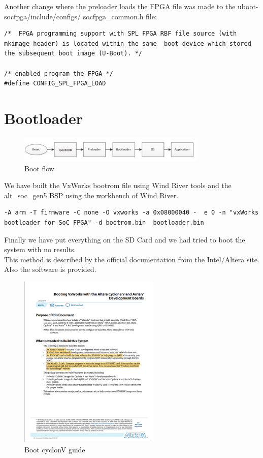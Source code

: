 Another change where the preloader loads the FPGA file was made to the uboot-socfpga/include/configs/ socfpga\_common.h file:

\begin{lstlisting}[style=myCode]
/*  FPGA programming support with SPL FPGA RBF file source (with mkimage header) is located within the same  boot device which stored the subsequent boot image (U-Boot). */

/* enabled program the FPGA */
#define CONFIG_SPL_FPGA_LOAD 
\end{lstlisting} 

\clearpage
\section{Bootloader}
\label{bootloader}

\begin{figure}[h]
	\centering		\includegraphics[width=0.8\textwidth]{img/bootschema1}
	\caption{Boot flow}
    	\label{fig:bootflow}
\end{figure}

We have built the  VxWorks bootrom file using Wind River tools and the alt\_soc\_gen5 BSP using the workbench of Wind River.
	
\begin{lstlisting}[style=myCode]
-A arm -T firmware -C none -O vxworks -a 0x08000040 -  e 0 -n "vxWorks bootloader for SoC FPGA" -d bootrom.bin  bootloader.bin 
\end{lstlisting} 

Finally we have put everything on the SD Card and we had tried to boot the system with no results.\\					
This method is described by the official documentation from the Intel/Altera site.  Also the software is provided.
\begin{figure}[h]
	\centering		\includegraphics[width=0.6\textwidth]{img/bootguide}
	\caption{Boot cyclonV guide}
    	\label{fig:bootguide}
\end{figure}

